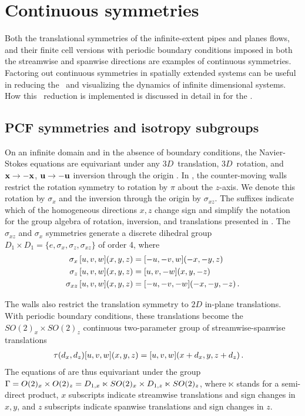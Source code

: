 \section{Continuous symmetries}

Both the translational symmetries of the infinite-extent
pipes and planes flows, and their finite cell versions with
periodic boundary conditions imposed in both the streamwise and
spanwise directions are examples of continuous symmetries.  Factoring
out continuous symmetries in spatially extended systems can be
useful in reducing the \statesp\  and visualizing the dynamics
of infinite dimensional systems.  How this \statesp\ reduction is
implemented is discussed in detail in
 for the \cLf.


\subsection{PCF symmetries and isotropy subgroups}
\label{s:symm}

On an infinite domain and in the absence of boundary conditions, the Navier-Stokes
equations are equivariant under any $3D$~translation, $3D$~rotation, and
${\bf x} \to -{\bf x}$, ${\bf u} \to -{\bf u}$ inversion through the origin .
In {\pCf}, the counter-moving walls restrict the rotation
symmetry to rotation by $\pi$ about the $z$-axis. We denote this rotation
by $\sigma_{x}$ and the inversion through the origin by $\sigma_{xz}$.
The suffixes indicate
which of the homogeneous directions $x,z$ change sign and simplify the
notation for the group algebra of rotation, inversion, and translations
presented in .
The $\sigma_{xz}$ and $\sigma_x$ symmetries generate a discrete dihedral group
$D_1 \times D_1 = \{e,\sigma_x,\sigma_{z},\sigma_{xz}\}$ of order 4, where
\begin{align}
\sigma_x    \, [u,v,w](x,y,z) &= [-u,-v,w](-x,-y,z) \nonumber \\
\sigma_z    \, [u,v,w](x,y,z) &= [u, v,-w](x,y,-z)  \label{sigma}\\
\sigma_{xz} \, [u,v,w](x,y,z) &= [-u,-v,-w](-x,-y,-z) \nonumber
\,.
\end{align}

The walls also restrict the translation symmetry to $2D$ in-plane
translations. With periodic boundary conditions, these translations
become the $SO(2)_x \times SO(2)_z$ continuous two-parameter
group of streamwise-spanwise translations
\begin{align}
\tau(d_x, d_z) [u, v, w](x,y,z) &= [u, v, w](x+d_x, y, z+ d_z)
\,.
\label{translation}
\end{align}
The equations of {\pCf} are thus equivariant under the group
$\Gamma = O(2)_x \times O(2)_z = D_{1,x} \ltimes SO(2)_{x} \times D_{1,z}
\ltimes SO(2)_z$, where $\ltimes$ stands for a semi-direct product,
$x$  subscripts indicate streamwise translations
and sign changes in $x,y$, and $z$ subscripts indicate spanwise translations
and sign changes in $z$.

